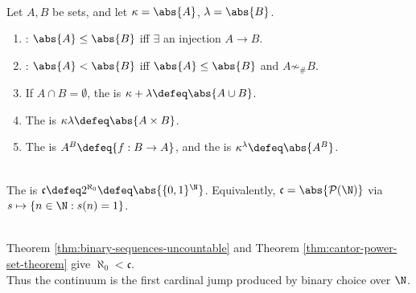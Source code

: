 \begin{definition} \label{def:cardinal-comparison-and-arithmetic} \\
Let $A,B$ be sets, and let $\kappa=\abs{A}$, $\lambda=\abs{B}$.
\begin{enumerate}[label=(\roman*)]
\setlength{\itemsep}{0pt}
\item {}: $\abs{A}\leq\abs{B}$ iff $\exists$ an injection $A\to B$.
\item {}: $\abs{A}<\abs{B}$ iff $\abs{A}\leq\abs{B}$ and $A\not\sim_{\#}B$.
\item If $A\cap B=\emptyset$, the  is $\kappa+\lambda\defeq\abs{A\cup B}$.
\item The  is $\kappa\lambda\defeq\abs{A\times B}$.
\item The  is $A^B\defeq\{f:B\to A\}$, and the  is $\kappa^\lambda\defeq\abs{A^B}$.
\end{enumerate}
\end{definition}

\begin{definition} \label{def:continuum-cardinal} \\
The  is $\mathfrak{c}\defeq 2^{\aleph_0}\defeq\abs{\{0,1\}^{\N}}$. Equivalently, $\mathfrak{c}=\abs{\mathcal{P}(\N)}$ via $s\mapsto\{n\in\N:s(n)=1\}$.
\end{definition}

\begin{perspective} \label{per:continuum-and-powerset-cardinality} \\
Theorem \ref{thm:binary-sequences-uncountable} and Theorem \ref{thm:cantor-power-set-theorem} give $\aleph_0<\mathfrak{c}$.\\
Thus the continuum is the first cardinal jump produced by binary choice over $\N$.
\end{perspective}
